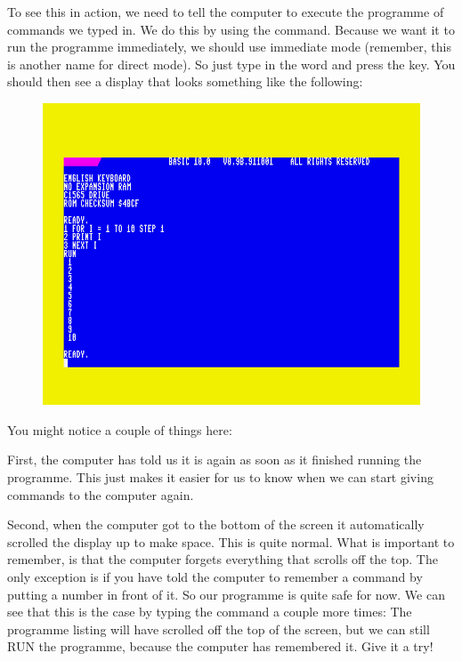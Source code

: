 To see this in action, we need to tell the computer to execute the programme of commands we typed in.
We do this by using the  command. Because we want it to run the programme immediately, we
should use immediate mode (remember, this is another name for direct mode).
So just type in the word  and press the  key.  You should then see a display
that looks something like the following:

\pagebreak

\setlength{\intextsep}{0pt}%
  \begin{figure}
    \includegraphics[width=\linewidth]{images/first-steps-for-loop-programme-1-running.png}
  \end{figure}

  You might notice a couple of things here:

  First, the computer has told us it is  again
  as soon as it finished running the programme. This just makes it easier for us to know when we
  can start giving commands to the computer again.

  Second, when the computer got to the bottom of the screen
  it automatically scrolled the display up to make space.  This is quite normal.  What is important
  to remember, is that the computer forgets everything that scrolls off the top.  The only exception
  is if you have told the computer to remember a command by putting a number in front of it.  So
  our programme is quite safe for now. We can see that this is the case by typing the  command a
  couple more times: The programme listing will have scrolled off the top of the screen, but we can
  still RUN the programme, because the computer has remembered it.  Give it a try!

